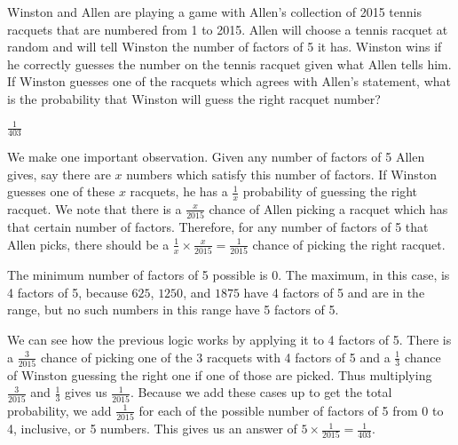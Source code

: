 \documentclass[11pt]{article}
\begin{document}
\begin{problem} Winston and Allen are playing a game with Allen's collection of 2015 tennis racquets that are numbered from 1 to 2015. Allen will choose a tennis racquet at random and will tell Winston the number of factors of 5 it has. Winston wins if he correctly guesses the number on the tennis racquet given what Allen tells him. If Winston guesses one of the racquets which agrees with Allen's statement, what is the probability that Winston will guess the right racquet number? 
\end{problem}
\begin{answer}
$\boxed{\frac{1}{403}}$
\end{answer}
\begin{solution} We make one important observation. Given any number of factors of 5 Allen gives, say there are $x$ numbers which satisfy this number of factors. If Winston guesses one of these $x$ racquets, he has a $\frac{1}{x}$ probability of guessing the right racquet. We note that there is a $\frac{x}{2015}$ chance of Allen picking a racquet which has that certain number of factors. Therefore, for any number of factors of 5 that Allen picks, there should be a $\frac{1}{x} \times \frac{x}{2015} = \frac{1}{2015}$ chance of picking the right racquet. 

The minimum number of factors of 5 possible is 0. The maximum, in this case, is 4 factors of 5, because $625$, $1250$, and $1875$ have 4 factors of 5 and are in the range, but no such numbers in this range have 5 factors of 5.

We can see how the previous logic works by applying it to 4 factors of 5. There is a $\frac{3}{2015}$ chance of picking one of the 3 racquets with 4 factors of 5 and a $\frac{1}{3}$ chance of Winston guessing the right one if one of those are picked. Thus multiplying $\frac{3}{2015}$ and $\frac{1}{3}$ gives us $\frac{1}{2015}$. Because we add these cases up to get the total probability, we add $\frac{1}{2015}$ for each of the possible number of factors of 5 from 0 to 4, inclusive, or 5 numbers. This gives us an answer of $5 \times \frac{1}{2015} = \boxed{\frac{1}{403}}$.
\end{solution}
\end{document}
